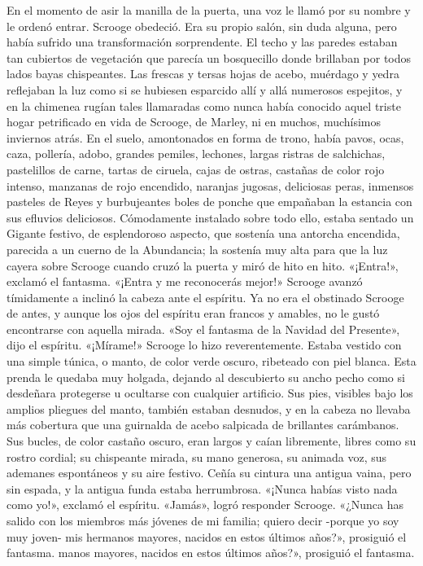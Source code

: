 \documentclass{novela}
\begin{document}
 En el momento de asir la manilla de la puerta, una voz le llamó por su nombre y le ordenó entrar. Scrooge obedeció.
 Era su propio salón, sin duda alguna, pero había sufrido una transformación sorprendente. El techo y las paredes estaban tan cubiertos de vegetación que parecía un bosquecillo donde brillaban por todos lados bayas chispeantes. Las frescas y tersas hojas de acebo, muérdago y yedra reflejaban la luz como si se hubiesen esparcido allí y allá numerosos espejitos, y en la chimenea rugían tales llamaradas como nunca había conocido aquel triste hogar petrificado en vida de Scrooge, de Marley, ni en muchos, muchísimos inviernos atrás. En el suelo, amontonados en forma de trono, había pavos, ocas, caza, pollería, adobo, grandes pemiles, lechones, largas ristras de salchichas, pastelillos de carne, tartas de ciruela, cajas de ostras, castañas de color rojo intenso, manzanas de rojo encendido, naranjas jugosas, deliciosas peras, inmensos pasteles de Reyes y burbujeantes boles de ponche que empañaban la estancia con sus efluvios deliciosos. Cómodamente instalado sobre todo ello, estaba sentado un Gigante festivo, de esplendoroso aspecto, que sostenía una antorcha encendida, parecida a un cuerno de la Abundancia; la sostenía muy alta para que la luz cayera sobre Scrooge cuando cruzó la puerta y miró de hito en hito.
 «¡Entra!», exclamó el fantasma. «¡Entra y me reconocerás mejor!»
 Scrooge avanzó tímidamente a inclinó la cabeza ante el espíritu. Ya no era el obstinado Scrooge de antes, y aunque los ojos del espíritu eran francos y amables, no le gustó encontrarse con aquella mirada.
 «Soy el fantasma de la Navidad del Presente», dijo el espíritu. «¡Mírame!»
 Scrooge lo hizo reverentemente. Estaba vestido con una simple túnica, o manto, de color verde oscuro, ribeteado con piel blanca. Esta prenda le quedaba muy holgada, dejando al descubierto su ancho pecho como si desdeñara protegerse u ocultarse con cualquier artificio. Sus pies, visibles bajo los amplios pliegues del manto, también estaban desnudos, y en la cabeza no llevaba más cobertura que una guirnalda de acebo salpicada de brillantes carámbanos. Sus bucles, de color castaño oscuro, eran largos y caían libremente, libres como su rostro cordial; su chispeante mirada, su mano generosa, su animada voz, sus ademanes espontáneos y su aire festivo. Ceñía su cintura una antigua vaina, pero sin espada, y la antigua funda estaba herrumbrosa.
 «¡Nunca habías visto nada como yo!», exclamó el espíritu.
 «Jamás», logró responder Scrooge.
 «¿Nunca has salido con los miembros más jóvenes de mi familia; quiero decir -porque yo soy muy joven- mis hermanos mayores, nacidos en estos últimos años?», prosiguió el fantasma. manos mayores, nacidos en estos últimos años?», prosiguió el fantasma.
\end{document}
